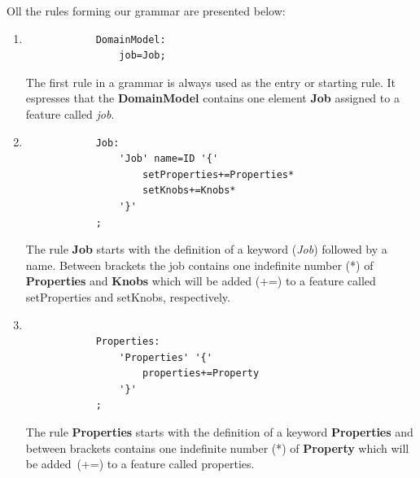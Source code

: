 Oll the rules forming our grammar are presented below:
\begin{enumerate}
	\item
		\singlespacing
		\begin{listing}[H]
		\begin{verbatim}
			DomainModel:
				job=Job;
		\end{verbatim}
		\label{listing:modelRule}
		\end{listing}

		The first rule in a grammar is always used as the entry or starting rule.
		It espresses that the \textbf{DomainModel} contains one element \textbf{Job}
		assigned to a feature called \textit{job}.

	\item
		\singlespacing
		\begin{listing}[H]
		\begin{verbatim}
			Job:
                'Job' name=ID '{'
                    setProperties+=Properties*
                    setKnobs+=Knobs*
                '}'
            ;	
		\end{verbatim}
		\label{listing:modelRule}
		\end{listing}

		The rule \textbf{Job} starts with the definition of a keyword ({\it Job})
		followed by a name. Between brackets the job contains one indefinite number
		(*) of \textbf{Properties} and \textbf{Knobs} which will be added (+=) to
        a feature called setProperties and setKnobs, respectively.

    \item
		\singlespacing
		\begin{listing}[H]
		\begin{verbatim}

            Properties:
                'Properties' '{'
                    properties+=Property
                '}'
            ;
		\end{verbatim}
		\label{listing:modelRule}
		\end{listing}

        The rule {\bf Properties} starts with the definition of a keyword {\bf Properties}
		and between brackets contains one indefinite number (*) of \textbf{Property}
		which will be added~(+=) to a feature called properties.


\end{enumerate}
